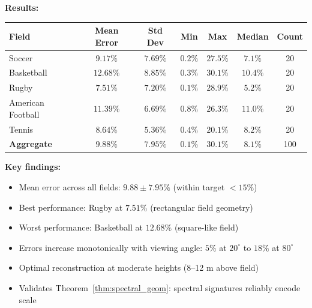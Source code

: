 \documentclass[11pt,twocolumn,a4paper]{article}
\theoremstyle{definition}
\begin{document}
\textbf{Results:}
\begin{table}[H]
\centering
\begin{tabular}{lcccccc}
\toprule
Field & Mean Error & Std Dev & Min & Max & Median & Count \\
\midrule
Soccer & $9.17\%$ & $7.69\%$ & $0.2\%$ & $27.5\%$ & $7.1\%$ & 20 \\
Basketball & $12.68\%$ & $8.85\%$ & $0.3\%$ & $30.1\%$ & $10.4\%$ & 20 \\
Rugby & $7.51\%$ & $7.20\%$ & $0.1\%$ & $28.9\%$ & $5.2\%$ & 20 \\
American Football & $11.39\%$ & $6.69\%$ & $0.8\%$ & $26.3\%$ & $11.0\%$ & 20 \\
Tennis & $8.64\%$ & $5.36\%$ & $0.4\%$ & $20.1\%$ & $8.2\%$ & 20 \\
\midrule
\textbf{Aggregate} & $\mathbf{9.88\%}$ & $\mathbf{7.95\%}$ & $0.1\%$ & $30.1\%$ & $8.1\%$ & 100 \\
\bottomrule
\end{tabular}
\end{table}

\textbf{Key findings:}
\begin{itemize}
    \item Mean error across all fields: $9.88 \pm 7.95\%$ (within target $< 15\%$)
    \item Best performance: Rugby at $7.51\%$ (rectangular field geometry)
    \item Worst performance: Basketball at $12.68\%$ (square-like field)
    \item Errors increase monotonically with viewing angle: $5\%$ at $20^\circ$ to $18\%$ at $80^\circ$
    \item Optimal reconstruction at moderate heights (8--12 m above field)
    \item Validates Theorem~\ref{thm:spectral_geom}: spectral signatures reliably encode scale
\end{itemize}
\end{document}
